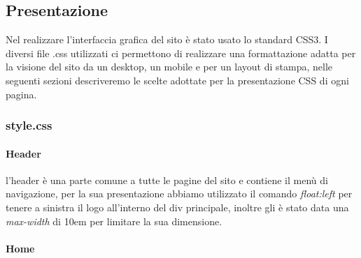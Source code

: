 \subsection{Presentazione}
Nel realizzare l'interfaccia grafica del sito è stato usato lo standard CSS3.\newline
I diversi file .css utilizzati ci permettono di realizzare una formattazione adatta per la visione del sito da un desktop, un mobile e per un layout di stampa, nelle seguenti sezioni descriveremo le scelte adottate per la presentazione CSS di ogni pagina.

\subsubsection{style.css}

\paragraph{Header} \mbox{}
l'header è una parte comune a tutte le pagine del sito e contiene il menù di navigazione, per la sua presentazione abbiamo utilizzato il comando \emph{float:left} per tenere a sinistra il logo all'interno del div principale, inoltre gli è stato data una \emph{max-width} di 10em per limitare la sua dimensione. 


\paragraph{Home} \mbox{}
